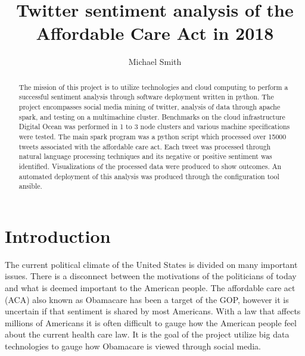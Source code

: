 
\title{Twitter sentiment analysis of the Affordable Care Act in 2018}


\author{Michael Smith}
  



\renewcommand{\shortauthors}{M. Smith}


\begin{abstract}
The mission of this project is to utilize technologies and cloud
computing to perform a successful sentiment analysis through software
deployment written in python.  The project encompasses social media
mining of twitter, analysis of data through apache spark, and testing
on a multimachine cluster.  Benchmarks on the cloud infrastructure
Digital Ocean was performed in 1 to 3 node clusters and various
machine specifications were tested.  The main spark program was a
python script which processed over 15000 tweets associated with the
affordable care act.  Each tweet was processed through natural
language processing techniques and its negative or positive sentiment
was identified.  Visualizations of the processed data were produced to
show outcomes.  An automated deployment of this analysis was produced
through the configuration tool ansible.

\end{abstract}






\maketitle

\section{Introduction}

The current political climate of the United States is divided on many
important issues.  There is a disconnect between the motivations of
the politicians of today and what is deemed important to the American
people.  The affordable care act (ACA) also known as Obamacare has
been a target of the GOP, however it is uncertain if that sentiment is
shared by most Americans.  With a law that affects millions of
Americans it is often difficult to gauge how the American people feel
about the current health care law.  It is the goal of the project
utilize big data technologies to gauge how Obamacare is viewed through
social media.

